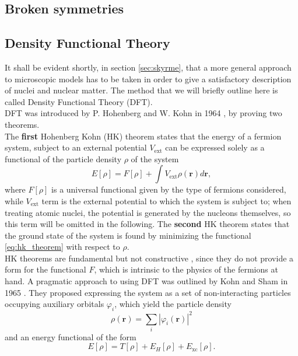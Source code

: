 \subsection{Broken symmetries}

\subsection{Density Functional Theory}
\label{sec:dft}
It shall be evident shortly, in section \ref{sec:skyrme}, that a more general approach to microscopic models has to be taken in order to give a satisfactory description of nuclei and nuclear matter. The method that we will briefly outline here is called Density Functional Theory (DFT).
\\DFT was introduced by P. Hohenberg and W. Kohn in 1964 \cite{HK}, by proving two theorems.
\\The \textbf{first} Hohenberg Kohn (HK) theorem states that the energy of a fermion system, subject to an external potential $V_\text{ext}$ can be expressed solely as a functional of the particle density $\rho$ of the system
\begin{equation}
    \label{eq:hk_theorem}
    E[\rho] = F[\rho] + \int V_\text{ext} \rho(\bm r) d\mathbf r,
\end{equation}
where $F[\rho]$ is a universal functional given by the type of fermions considered, while $V_\text{ext}$ term is the external potential to which the system is subject to; when treating atomic nuclei, the potential is generated by the nucleons themselves, so this term will be omitted in the following.
The \textbf{second} HK theorem states that the ground state of the system is found by minimizing the functional \eqref{eq:hk_theorem} with respect to $\rho$. 
\\HK theorems are fundamental but not constructive \cite{NDFT}, since they do not provide a form for the functional $F$, which is intrinsic to the physics of the fermions at hand.
A pragmatic approach to using DFT was outlined by Kohn and Sham in 1965 \cite{KS}. They proposed expressing the system as a set of non-interacting particles occupying auxiliary orbitals $\varphi_i$, which yield the particle density
\begin{equation}
    \rho(\bm r)=\sum_i |\varphi_i(\bm r)|^2 
\end{equation}
and an energy functional of the form
\begin{equation}
    E[\rho] = T[\rho] + E_H[\rho] + E_\text{xc}[\rho].
\end{equation}
